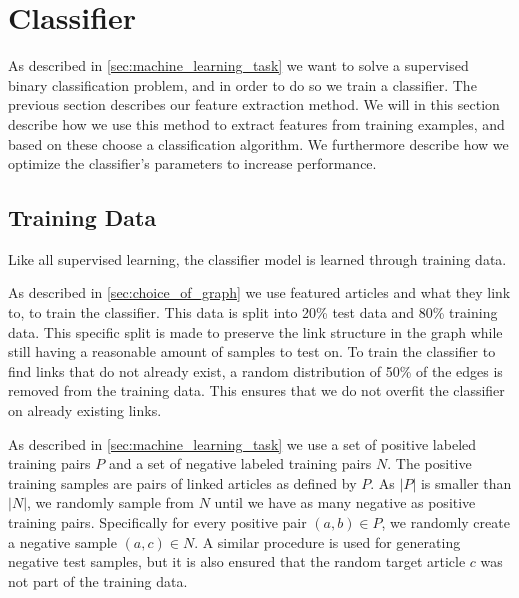 \section{Classifier}\label{sec:classifier}
As described in \cref{sec:machine_learning_task} we want to solve a supervised binary classification problem, and in order to do so we train a classifier. The previous section describes our feature extraction method. We will in this section describe how we use this method to extract features from training examples, and based on these choose a classification algorithm. We furthermore describe how we optimize the classifier's parameters to increase performance.

\subsection{Training Data}\label{sec:training_data}
Like all supervised learning, the classifier model is learned through training data.

As described in \ref{sec:choice_of_graph} we use featured articles and what they link to, to train the classifier. This data is split into 20\% test data and 80\% training data. This specific split is made to preserve the link structure in the graph while still having a reasonable amount of samples to test on. To train the classifier to find links that do not already exist, a random distribution of 50\% of the edges is removed from the training data. This ensures that we do not overfit the classifier on already existing links. 


As described in \cref{sec:machine_learning_task} we use a set of positive labeled training pairs $P$ and a set of negative labeled training pairs $N$. The positive training samples are pairs of linked articles as defined by $P$. As $\left\vert{P}\right\vert$ is smaller than $\left\vert{N}\right\vert$, we randomly sample from $N$ until we have as many negative as positive training pairs. Specifically for every positive pair $(a,b) \in P$, we randomly create a negative sample $(a,c) \in N$. A similar procedure is used for generating negative test samples, but it is also ensured that the random target article $c$ was not part of the training data.

